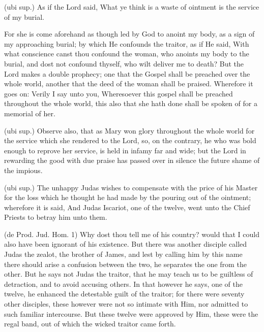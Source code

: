  (ubi sup.) As if the Lord said, What ye think is a waste of ointment is the service of my burial.

 For she is come aforehand as though led by God to anoint my body, as a sign of my approaching burial; by which He confounds the traitor, as if He said, With what conscience canst thou confound the woman, who anoints my body to the burial, and dost not confound thyself, who wilt deliver me to death? But the Lord makes a double prophecy; one that the Gospel shall be preached over the whole world, another that the deed of the woman shall be praised. Wherefore it goes on: Verily I say unto you, Wheresoever this gospel shall be preached throughout the whole world, this also that she hath done shall be spoken of for a memorial of her.

 (ubi sup.) Observe also, that as Mary won glory throughout the whole world for the service which she rendered to the Lord, so, on the contrary, he who was bold enough to reprove her service, is held in infamy far and wide; but the Lord in rewarding the good with due praise has passed over in silence the future shame of the impious.

 

 (ubi sup.) The unhappy Judas wishes to compensate with the price of his Master for the loss which he thought he had made by the pouring out of the ointment; wherefore it is said, And Judas Iscariot, one of the twelve, went unto the Chief Priests to betray him unto them.

 (de Prod. Jud. Hom. 1) Why dost thou tell me of his country? would that I could also have been ignorant of his existence. But there was another disciple called Judas the zealot, the brother of James, and lest by calling him by this name there should arise a confusion between the two, he separates the one from the other. But he says not Judas the traitor, that he may teach us to be guiltless of detraction, and to avoid accusing others. In that however he says, one of the twelve, he enhanced the detestable guilt of the traitor; for there were seventy other disciples, these however were not so intimate with Him, nor admitted to such familiar intercourse. But these twelve were approved by Him, these were the regal band, out of which the wicked traitor came forth.

